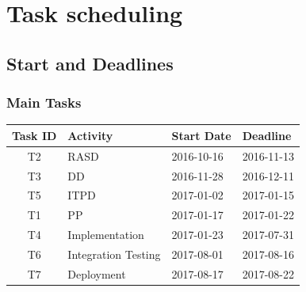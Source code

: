 \documentclass{article}
\begin{document}
		\pagebreak
		
	\section{Task scheduling}
		
		\subsection{Start and Deadlines}
		\subsubsection{Main Tasks}
		\begin{table}[h!]
			\centering
			\begin{tabular}{| c | l | l | l |}
				\hline
				\textbf{Task ID}   &\textbf{Activity}   & \textbf{Start Date}   & \textbf{Deadline} \\
				\hline
				T2 & RASD                & 2016-10-16            & 2016-11-13        \\\hline
				T3 & DD                  & 2016-11-28            & 2016-12-11        \\\hline
				T5 & ITPD                & 2017-01-02            & 2017-01-15        \\\hline
				T1 & PP                  & 2017-01-17            & 2017-01-22        \\\hline
				T4 & Implementation      & 2017-01-23            & 2017-07-31        \\\hline
				T6 & Integration Testing & 2017-08-01            & 2017-08-16        \\\hline
				T7 & Deployment          & 2017-08-17            & 2017-08-22        \\\hline
			\end{tabular}
		\end{table}
\end{document}
